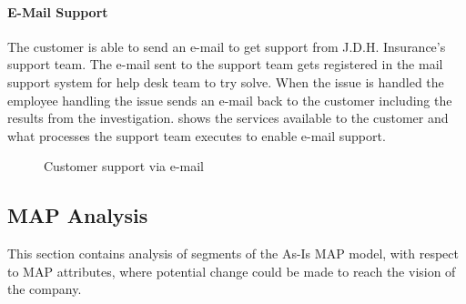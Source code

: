 \paragraph{E-Mail Support}
\label{sec:mail_support}
The customer is able to send an e-mail to get support from J.D.H. Insurance's support team. The e-mail sent to the support team gets registered in the mail support system for help desk team to try solve. When the issue is handled the employee handling the issue sends an e-mail back to the customer including the results from the investigation.  shows the services available to the customer and what processes the support team executes to enable e-mail support.
\begin{center}
	\begin{figure}[H]
		\centering
		\setlength\fboxsep{7pt}
		\setlength\fboxrule{0.5pt}
		\caption{Customer support via e-mail}
		\label{fig:map_mail}
	\end{figure}
\end{center}
%

\subsection{MAP Analysis}
\label{sec:map_analysis}
This section contains analysis of segments of the As-Is MAP model, with respect to MAP attributes, where potential change could be made to reach the vision of the company.

